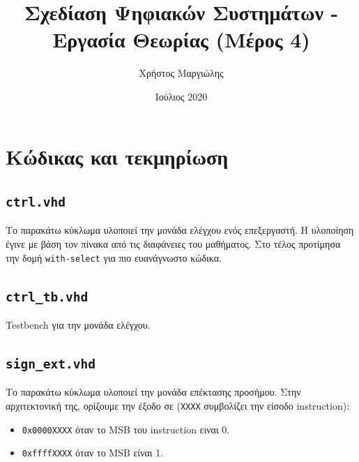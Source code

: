 \documentclass{article}
\title{Σχεδίαση Ψηφιακών Συστημάτων - Εργασία Θεωρίας (Μέρος 4)}
\author{Χρήστος Μαργιώλης}
\date{Ιούλιος 2020}
\begin{document}
\begin{titlepage}
        \maketitle
\end{titlepage}

\renewcommand{\contentsname}{Περιεχόμενα}
\tableofcontents

\section{Κώδικας και τεκμηρίωση}

\subsection{\lstinline{ctrl.vhd}}

Το παρακάτω κύκλωμα υλοποιεί την μονάδα ελέγχου ενός επεξεργαστή. Η υλοποίηση
έγινε με βάση τον πίνακα από τις διαφάνειες του μαθήματος. Στο τέλος προτίμησα
την δομή \lstinline{with-select} για πιο ευανάγνωστο κώδικα. \\


\pagebreak

\subsection{\lstinline{ctrl_tb.vhd}}

Testbench για την μονάδα ελέγχου. \\


\pagebreak

\subsection{\lstinline{sign_ext.vhd}}

Το παρακάτω κύκλωμα υλοποιεί την μονάδα επέκτασης προσήμου. Στην αρχιτεκτονική
της, ορίζουμε την έξοδο σε (\lstinline{XXXX} συμβολίζει την είσοδο instruction):
\begin{itemize}
	\item \lstinline{0x0000XXXX} όταν το MSB του instruction ειναι 0.
	\item \lstinline{0xffffXXXX} όταν το MSB είναι 1. \\
\end{itemize}


\pagebreak
\end{document}
